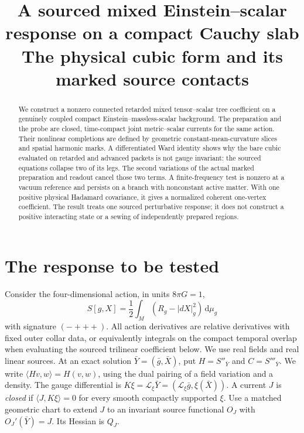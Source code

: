 \documentclass[11pt]{article}
\title{A sourced mixed Einstein--scalar response on a compact Cauchy slab\\
\large The physical cubic form and its marked source contacts}
\author{}
\date{}
\newcommand{\dd}{\,\mathrm d}
\newcommand{\Lie}{\mathcal L}
\numberwithin{equation}{section}
\begin{document}
\maketitle
\begin{abstract}
We construct a nonzero connected retarded mixed tensor--scalar
tree coefficient on a genuinely coupled compact Einstein--massless-scalar
background. The preparation and the probe are closed, time-compact
joint metric--scalar currents for the same action. Their nonlinear
completions are defined by geometric constant-mean-curvature slices
and spatial harmonic marks. A differentiated Ward identity shows why
the bare cubic evaluated on retarded and advanced packets is not gauge
invariant: the sourced equations collapse two of its legs. The
second variations of the actual marked preparation and readout
cancel those two terms. A finite-frequency test is nonzero at a
vacuum reference and persists on a branch with nonconstant active
matter. With one positive physical Hadamard covariance, it gives a
normalized coherent one-vertex coefficient. The result treats one
sourced perturbative response; it does not construct a positive
interacting state or a sewing of independently prepared regions.
\end{abstract}

\section{The response to be tested}

Consider the four-dimensional action, in units \(8\pi G=1\),
\begin{equation}
 S[g,X]=\frac12\int_M (R_g-|dX|_g^2)\dd\mu_g
 \label{eq:action}
\end{equation}
with signature \((-+++)\). All action derivatives are relative
derivatives with fixed outer collar data, or equivalently
integrals on the compact temporal overlap when evaluating the
sourced trilinear coefficient below. We use real fields and real
linear sources. At an exact solution \(\bar Y=(\bar g,\bar X)\), put
\(H=S''_{\bar Y}\) and \(C=S'''_{\bar Y}\). We write
\(\langle Hv,w\rangle=H(v,w)\), using the dual pairing of a
field variation and a density. The gauge differential is
\(K\xi=\Lie_\xi\bar Y=(\Lie_\xi\bar g,\xi(\bar X))\).
A current \(J\) is \emph{closed} if \(\langle J,K\xi\rangle=0\)
for every smooth compactly supported \(\xi\).
Use a matched geometric chart to extend \(J\) to an invariant
source functional \(O_J\) with \(O_J'(\bar Y)=J\).
Its Hessian is \(Q_J\).
\end{document}
